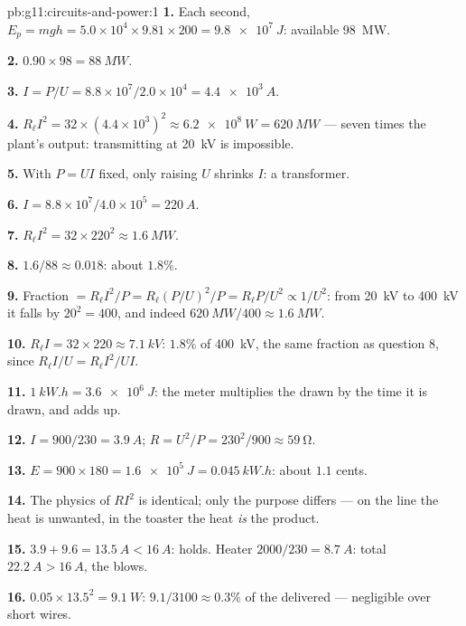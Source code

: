 \begin{solution}{pb:g11:circuits-and-power:1}
\textbf{1.} Each second, $E_p = mgh = 5.0\times10^{4} \times 9.81 \times
200 = \qty{9.8e7}{J}$: available  \qty{98}{MW}.

\textbf{2.} $0.90 \times 98 = \qty{88}{MW}$.

\textbf{3.} $I = P/U = 8.8\times10^{7}/2.0\times10^{4} = \qty{4.4e3}{A}$.

\textbf{4.} $R_\ell I^2 = 32 \times (4.4\times10^{3})^2 \approx
\qty{6.2e8}{W} = \qty{620}{MW}$ --- seven times the plant's output:
transmitting at \qty{20}{kV} is impossible.

\textbf{5.} With $P = UI$ fixed, only raising $U$ shrinks $I$: a
transformer.

\textbf{6.} $I = 8.8\times10^{7}/4.0\times10^{5} = \qty{220}{A}$.

\textbf{7.} $R_\ell I^2 = 32 \times 220^2 \approx \qty{1.6}{MW}$.

\textbf{8.} $1.6/88 \approx 0.018$: about $1.8\%$.

\textbf{9.} Fraction $= R_\ell I^2/P = R_\ell (P/U)^2/P = R_\ell P/U^2
\propto 1/U^2$: from \qty{20}{kV} to \qty{400}{kV} it falls by
$20^2 = 400$, and indeed $\qty{620}{MW}/400 \approx \qty{1.6}{MW}$.

\textbf{10.} $R_\ell I = 32 \times 220 \approx \qty{7.1}{kV}$: $1.8\%$
of \qty{400}{kV}, the same fraction as question 8, since
$R_\ell I/U = R_\ell I^2/UI$.

\textbf{11.} $\qty{1}{kW.h} = \qty{3.6e6}{J}$: the meter multiplies the
 drawn by the time it is drawn, and adds up.

\textbf{12.} $I = 900/230 = \qty{3.9}{A}$;
$R = U^2/P = 230^2/900 \approx \qty{59}{\ohm}$.

\textbf{13.} $E = 900 \times 180 = \qty{1.6e5}{J} = \qty{0.045}{kW.h}$:
about $1.1$ cents.

\textbf{14.} The physics of $RI^2$ is identical; only the purpose
differs --- on the line the heat is unwanted, in the toaster the heat
\emph{is} the product.

\textbf{15.} $3.9 + 9.6 = \qty{13.5}{A} < \qty{16}{A}$: holds. Heater
$2000/230 = \qty{8.7}{A}$: total $\qty{22.2}{A} > \qty{16}{A}$, the 
blows.

\textbf{16.} $0.05 \times 13.5^2 = \qty{9.1}{W}$: $9.1/3100 \approx
0.3\%$ of the delivered  --- negligible over short wires.


\end{solution}
